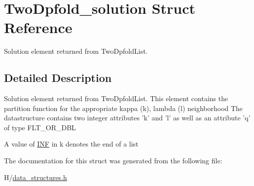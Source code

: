 \hypertarget{structTwoDpfold__solution}{
\section{TwoDpfold\_\-solution Struct Reference}
\label{structTwoDpfold__solution}
}


Solution element returned from TwoDpfoldList.  




\subsection{Detailed Description}
Solution element returned from TwoDpfoldList. This element contains the partition function for the appropriate kappa (k), lambda (l) neighborhood The datastructure contains two integer attributes 'k' and 'l' as well as an attribute 'q' of type FLT\_\-OR\_\-DBL

A value of \hyperlink{energy__const_8h_a12c2040f25d8e3a7b9e1c2024c618cb6}{INF} in k denotes the end of a list 

The documentation for this struct was generated from the following file:\begin{DoxyCompactItemize}
\item 
H/\hyperlink{data__structures_8h}{data\_\-structures.h}\end{DoxyCompactItemize}
